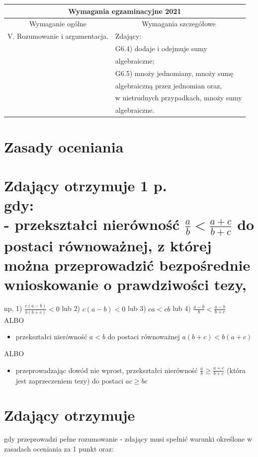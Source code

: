 \documentclass[10pt]{article}
\begin{document}
\begin{center}
\begin{tabular}{|l|l|}
\hline
\multicolumn{2}{|c|}{Wymagania egzaminacyjne 2021} \\
\hline
\multicolumn{1}{|c|}{Wymaganie ogólne} & \multicolumn{1}{c|}{Wymagania szczegółowe} \\
\hline
V. Rozumowanie i argumentacja. & Zdający: \\
 & G6.4) dodaje i odejmuje sumy \\
 & algebraiczne; \\
 & G6.5) mnoży jednomiany, mnoży sumę \\
 & algebraiczną przez jednomian oraz, \\
 & w nietrudnych przypadkach, mnoży sumy \\
 & algebraiczne. \\
\hline
\end{tabular}
\end{center}

\section*{Zasady oceniania}
\section*{Zdający otrzymuje 1 p. \\
 gdy: \\
 - przekształci nierówność $\frac{a}{b}<\frac{a+c}{b+c}$ do postaci równoważnej, z której można przeprowadzić bezpośrednie wnioskowanie o prawdziwości tezy,}
np. 1) $\frac{c(a-b)}{b(b+c)}<0$ lub 2) $c(a-b)<0$ lub 3) $c a<c b$ lub 4) $\frac{a-b}{b}<\frac{a-b}{b+c}$\\
ALBO

\begin{itemize}
  \item przekształci nierówność $a<b$ do postaci równoważnej $a(b+c)<b(a+c)$
\end{itemize}

ALBO

\begin{itemize}
  \item przeprowadzając dowód nie wprost, przekształci nierówność $\frac{a}{b} \geq \frac{a+c}{b+c}$ (która jest zaprzeczeniem tezy) do postaci $a c \geq b c$
\end{itemize}

\section*{Zdający otrzymuje}
gdy przeprowadzi pełne rozumowanie - zdający musi spełnić warunki określone w zasadach oceniania za 1 punkt oraz:
\end{document}
